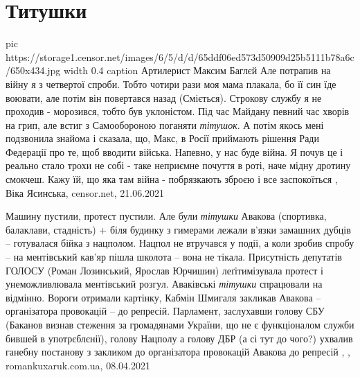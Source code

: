  
 
 
 
 
\chapter{Титушки}

\ifcmt
  pic https://storage1.censor.net/images/6/5/d/d/65ddf06ed573d50909d25b5111b78a6c/650x434.jpg
	width 0.4
	caption Артилерист Максим Баглєй
\fi
Але потрапив на війну я з четвертої спроби. Тобто чотири рази моя мама плакала,
бо її син їде воювати, але потім він повертався назад (Сміється). Строкову
службу я не проходив - морозився, тобто був уклоністом. Під час Майдану певний
час хворів на грип, але встиг з Самообороною поганяти \emph{тітушок}. А потім якось
мені подзвонила знайома і сказала, що, Макс, в Росії приймають рішення Ради
Федерації про те, щоб вводити війська. Напевно, у нас буде війна. Я почув це і
реально стало трохи не собі - таке неприємне почуття в роті, наче мідну дротину
смокчеш. Кажу їй, що яка там війна - побрязкають зброєю і все заспокоїться
, 
Віка Ясинська, censor.net, 21.06.2021

Машину пустили, протест пустили.  Але були \emph{тітушки} Авакова (спортивка,
балаклави, стадність) + біля будинку з гимерами лежали в'язки замашних дубців
-- готувалася бійка з нацполом.  Нацпол не втручався у події, а коли зробив
спробу -- на ментівський кав'яр пішла школота -- вона не тікала.  Присутність
депутатів ГОЛОСУ (Роман Лозинський, Ярослав Юрчишин) леґітимізувала протест і
унеможливлювала ментівський розгул.  Аваківські \emph{тітушки} спрацювали на відмінно.
Вороги отримали картінку, Кабмін Шмигаля закликав Авакова -- організатора
провокацій -- до репресій. Парламент, заслухавши голову СБУ (Баканов визнав
стеження за громадянами України, що не є функціоналом служби бившей в
употрєблєнії), голову Нацполу а голову ДБР (а сі тут до чого?) ухвалив ганебну
постанову з закликом до організатора провокацій Авакова до репресій
, , romankuxaruk.com.ua, 08.04.2021

